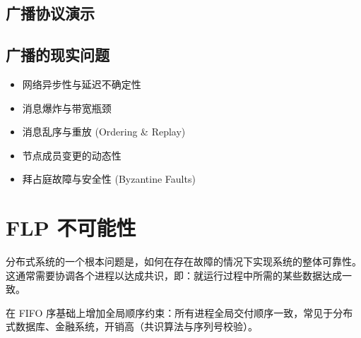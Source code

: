 \subsection{广播协议演示}

\subsection{广播的现实问题}

\begin{itemize}
\item 网络异步性与延迟不确定性
\item 消息爆炸与带宽瓶颈
\item 消息乱序与重放 (Ordering \& Replay)
\item 节点成员变更的动态性
\item 拜占庭故障与安全性 (Byzantine Faults)
\end{itemize}

\section{FLP 不可能性}

分布式系统的一个根本问题是，如何在存在故障的情况下实现系统的整体可靠性。这通常需要协调各个进程以达成共识，即：就运行过程中所需的某些数据达成一致。


在 FIFO 序基础上增加全局顺序约束：所有进程全局交付顺序一致，常见于分布式数据库、金融系统，开销高（共识算法与序列号校验）。
